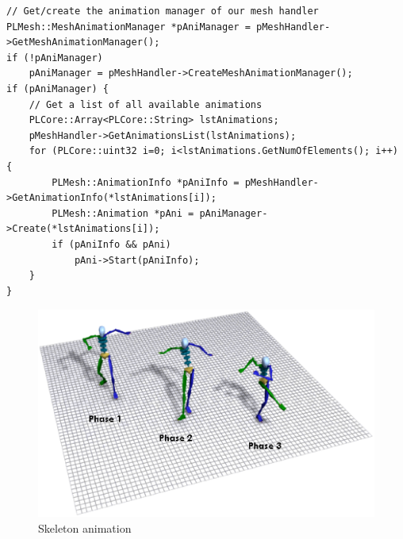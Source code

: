 \begin{lstlisting}[caption=Animation playback]
// Get/create the animation manager of our mesh handler
PLMesh::MeshAnimationManager *pAniManager = pMeshHandler->GetMeshAnimationManager();
if (!pAniManager)
	pAniManager = pMeshHandler->CreateMeshAnimationManager();
if (pAniManager) {
	// Get a list of all available animations
	PLCore::Array<PLCore::String> lstAnimations;
	pMeshHandler->GetAnimationsList(lstAnimations);
	for (PLCore::uint32 i=0; i<lstAnimations.GetNumOfElements(); i++) {
		PLMesh::AnimationInfo *pAniInfo = pMeshHandler->GetAnimationInfo(*lstAnimations[i]);
		PLMesh::Animation *pAni = pAniManager->Create(*lstAnimations[i]);
		if (pAniInfo && pAni)
			pAni->Start(pAniInfo);
	}
}
\end{lstlisting}

\begin{figure}
  \centering
  \includegraphics[scale=0.5]{pics/Joints.eps}
  \caption{Skeleton animation}
  \label{fig:Skeleton animation}
\end{figure}
